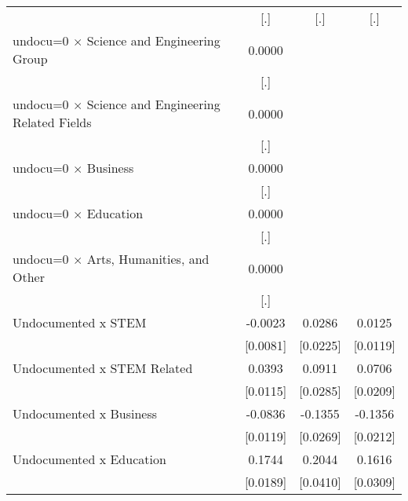 \begin{table}[htbp]
\begin{tabular}{l*{3}{c}}
                    &         [.]         &         [.]         &         [.]         \\
\addlinespace
undocu=0 $\times$ Science and Engineering Group&      0.0000         &                     &                     \\
                    &         [.]         &                     &                     \\
\addlinespace
undocu=0 $\times$ Science and Engineering Related Fields&      0.0000         &                     &                     \\
                    &         [.]         &                     &                     \\
\addlinespace
undocu=0 $\times$ Business&      0.0000         &                     &                     \\
                    &         [.]         &                     &                     \\
\addlinespace
undocu=0 $\times$ Education&      0.0000         &                     &                     \\
                    &         [.]         &                     &                     \\
\addlinespace
undocu=0 $\times$ Arts, Humanities, and Other&      0.0000         &                     &                     \\
                    &         [.]         &                     &                     \\
\addlinespace
Undocumented x STEM &     -0.0023         &      0.0286         &      0.0125         \\
                    &    [0.0081]         &    [0.0225]         &    [0.0119]         \\
\addlinespace
Undocumented x STEM Related&      0.0393\sym{***}&      0.0911\sym{***}&      0.0706\sym{***}\\
                    &    [0.0115]         &    [0.0285]         &    [0.0209]         \\
\addlinespace
Undocumented x Business&     -0.0836\sym{***}&     -0.1355\sym{***}&     -0.1356\sym{***}\\
                    &    [0.0119]         &    [0.0269]         &    [0.0212]         \\
\addlinespace
Undocumented x Education&      0.1744\sym{***}&      0.2044\sym{***}&      0.1616\sym{***}\\
                    &    [0.0189]         &    [0.0410]         &    [0.0309]         \\

\end{tabular}
\end{table}
